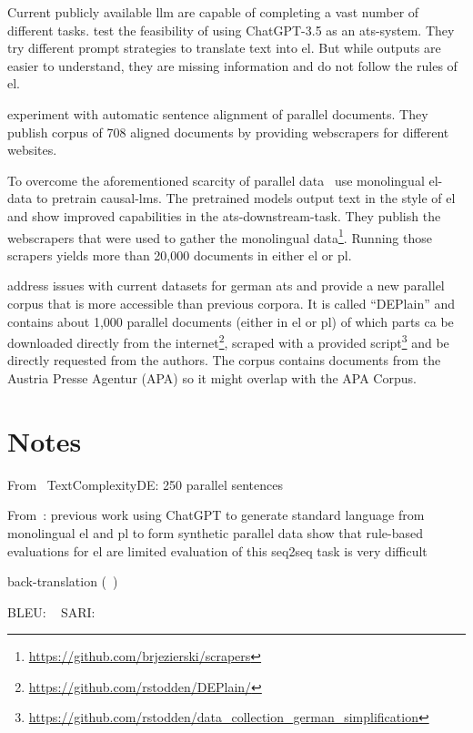 Current publicly available \gls{llm} are capable of completing a vast number of different tasks.
\textcite{deilen2023using} test the feasibility of using ChatGPT-3.5 as an \gls{ats}-system.
They try different prompt strategies to translate text into \gls{el}.
But while outputs are easier to understand, they are missing information and do not follow the rules of \gls{el}.

\textcite{toborek2023new} experiment with automatic sentence alignment of parallel documents.
They publish corpus of 708 aligned documents by providing \gls{webscraper}s for different websites.

To overcome the aforementioned scarcity of parallel data~\textcite{Ansch_tz_2023} use monolingual \gls{el}-data to pretrain \gls{causal-lm}s.
The pretrained models output text in the style of \gls{el} and show improved capabilities in the \gls{ats}-downstream-task.
They publish the \gls{webscraper}s that were used to gather the monolingual data\footnote{\url{https://github.com/brjezierski/scrapers}}.
Running those scrapers yields more than 20,000 documents in either \gls{el} or \gls{pl}.

\textcite{stodden-etal-2023-deplain} address issues with current datasets for german \gls{ats} and provide a new parallel corpus that is more accessible than previous corpora.
It is called \enquote{DEPlain} and contains about 1,000 parallel documents (either in \gls{el} or \gls{pl}) of which parts ca be downloaded directly from the internet\footnote{\url{https://github.com/rstodden/DEPlain/}}, scraped with a provided script\footnote{\url{https://github.com/rstodden/data_collection_german_simplification}} and be directly requested from the authors.
The corpus contains documents from the Austria Presse Agentur (APA) so it might overlap with the APA Corpus.



\section{Notes}\label{sec:notes}



From~\autocite{naderi2019subjective}
TextComplexityDE: 250 parallel sentences




From~\autocite{klöser2024german}:
previous work
using ChatGPT to generate standard language from monolingual \gls{el} and \gls{pl} to form synthetic parallel data
show that rule-based evaluations for \gls{el} are limited
evaluation of this seq2seq task is very difficult

back-translation (~\autocite{sennrich-etal-2016-improving})





BLEU: ~\autocite{papineni-etal-2002-bleu}
SARI: ~\autocite{xu-etal-2016-optimizing}
